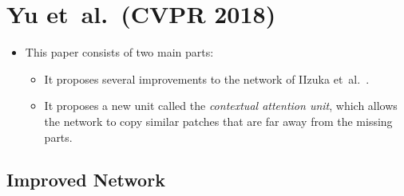 \documentclass[10pt]{article}
\newcommand{\etal}{{et~al.}}
\begin{document}
  \section{Yu \etal~(CVPR 2018)}

  \begin{itemize}
  	\item This paper consists of two main parts:
    \begin{itemize}
      \item It proposes several improvements to the network of IIzuka \etal~\cite{Iizuka:2017}.

      \item It proposes a new unit called the \emph{contextual attention unit}, which allows the network to copy similar patches that are far away from the missing parts.
    \end{itemize}
  \end{itemize}

  \subsection{Improved Network}
\end{document}

